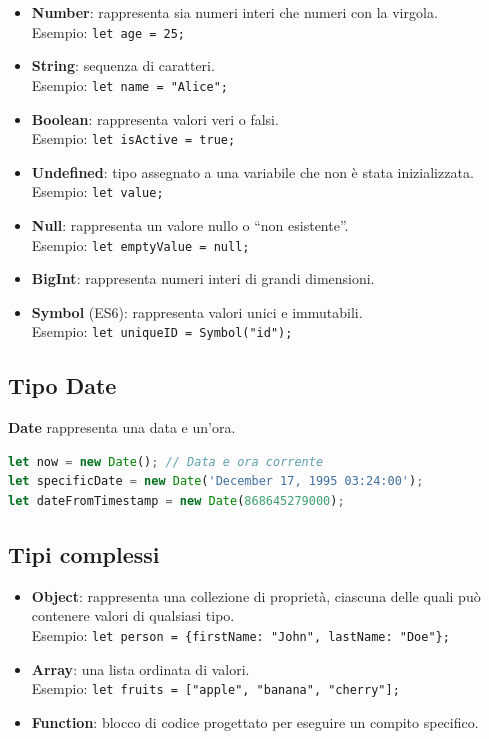\begin{itemize}
    \item \textbf{Number}: rappresenta sia numeri interi che numeri con la virgola.\\
        Esempio: \texttt{let age = 25;}
    \item \textbf{String}: sequenza di caratteri.\\
        Esempio: \texttt{let name = "Alice";}
    \item \textbf{Boolean}: rappresenta valori veri o falsi.\\
        Esempio: \texttt{let isActive = true;}
    \item \textbf{Undefined}: tipo assegnato a una variabile che non è stata inizializzata.\\
        Esempio: \texttt{let value;}
    \item \textbf{Null}: rappresenta un valore nullo o ``non esistente''.\\
        Esempio: \texttt{let emptyValue = null;}
    \item \textbf{BigInt}: rappresenta numeri interi di grandi dimensioni.
    \item \textbf{Symbol} (ES6): rappresenta valori unici e immutabili.\\
        Esempio: \texttt{let uniqueID = Symbol("id");}
\end{itemize}

\subsection{Tipo Date}

\textbf{Date} rappresenta una data e un'ora.

\begin{lstlisting}[language=JavaScript]
let now = new Date(); // Data e ora corrente
let specificDate = new Date('December 17, 1995 03:24:00');
let dateFromTimestamp = new Date(868645279000);
\end{lstlisting}

\subsection{Tipi complessi}

\begin{itemize}
    \item \textbf{Object}: rappresenta una collezione di proprietà, ciascuna delle quali può contenere valori di qualsiasi tipo.\\
        Esempio: \texttt{let person = \{firstName: "John", lastName: "Doe"\};}
    \item \textbf{Array}: una lista ordinata di valori.\\
        Esempio: \texttt{let fruits = ["apple", "banana", "cherry"];}
    \item \textbf{Function}: blocco di codice progettato per eseguire un compito specifico.
\end{itemize}

